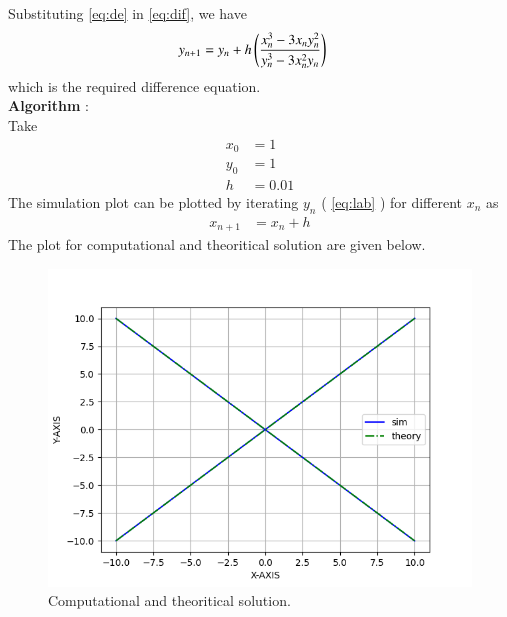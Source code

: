 \documentclass[journal]{IEEEtran}
\begin{document}
Substituting \eqref{eq:de} in \eqref{eq:dif}, we have 
\begin{align}
	y_{n+1} &= y_{n} + h \left(\frac{x_{n}^3 - 3x_{n}y_{n}^2}{y_{n}^3 - 3x_{n}^2y_{n}}\right) \label{eq:lab}
\end{align}
which is the required difference equation. \\
\textbf{Algorithm} : \\
Take
\begin{align}
	x_0 &= 1 \\
	y_0 &= 1 \\
	h &= 0.01 
\end{align}
The simulation plot can be plotted by iterating $y_{n}$ ( \eqref{eq:lab} ) for different $x_{n}$ as
\begin{align}
	x_{n+1} &= x_{n} + h 
\end{align}
The plot for computational and theoritical solution are given below.
\begin{figure}[h]
				 \centering
				 \includegraphics[width=\columnwidth]{figs/fig1.png}
				 \caption{Computational and theoritical solution.}
				 \label{fig:Plot1} 
			 \end{figure}



	
\end{document}

